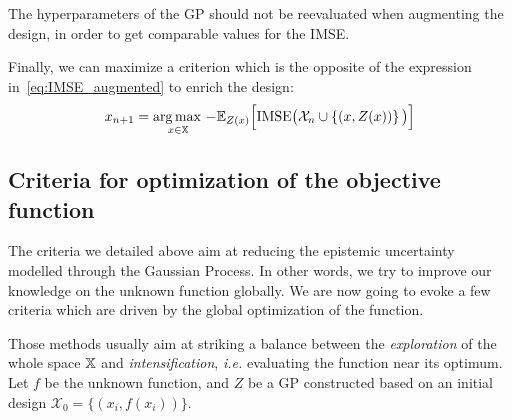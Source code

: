 \documentclass[../../Main_ManuscritThese.tex]{subfiles}
\newcommand\imgpath{/home/victor/acadwriting/Manuscrit/Text/Chapter4/img/}
\begin{document}
The hyperparameters of the GP should not be reevaluated when augmenting the design, in order to get comparable values for the IMSE.\@

Finally, we can maximize a criterion which is the opposite of the expression in~\cref{eq:IMSE_augmented} to enrich the design:
\begin{equation}
  x_{n+1} = \operatorname*{arg\,max \,}_{x\in \mathbb{X}}-\mathbb{E}_{Z(x)}\Big[\mathrm{IMSE} \big(\mathcal{X}_n \cup \left\{(x, Z(x))\right\} \big)\Big]
\end{equation}

%   


\subsection{Criteria for optimization of the objective function}
\label{sec:GP_optimization_criteria}
The criteria we detailed above aim at reducing the epistemic
uncertainty modelled through the Gaussian Process. In other words, we
try to improve our knowledge on the unknown function globally. We are
now going to evoke a few criteria which are driven by the global
optimization of the function.

Those methods usually aim at striking a balance between the
\emph{exploration} of the whole space $\mathbb{X}$ and
\emph{intensification}, \textit{i.e.} evaluating the function near its
optimum.  Let $f$ be the unknown function, and $Z$ be a GP constructed
based on an initial design $\mathcal{X}_0 = \{(x_i, f(x_i))\}$.
\end{document}
